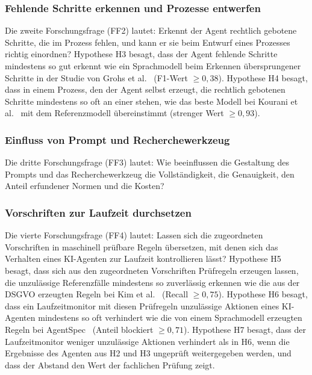 \subsubsection{Fehlende Schritte erkennen und Prozesse entwerfen}\label{sec:ff2}
Die zweite Forschungsfrage (FF2) lautet: Erkennt der Agent rechtlich gebotene Schritte, die im Prozess fehlen, und kann er sie beim Entwurf eines Prozesses richtig einordnen?
Hypothese H3 besagt, dass der Agent fehlende Schritte mindestens so gut erkennt wie ein Sprachmodell beim Erkennen übersprungener Schritte in der Studie von Grohs et al.~\cite{grohs2025} (F1-Wert $\geq 0{,}38$).
Hypothese H4 besagt, dass in einem Prozess, den der Agent selbst erzeugt, die rechtlich gebotenen Schritte mindestens so oft an einer  stehen, wie das beste Modell bei Kourani et al.~\cite{kourani2024} mit dem Referenzmodell übereinstimmt (strenger Wert $\geq 0{,}93$).

\subsubsection{Einfluss von Prompt und Recherchewerkzeug}\label{sec:ff3}
Die dritte Forschungsfrage (FF3) lautet: Wie beeinflussen die Gestaltung des Prompts und das Recherchewerkzeug die Vollständigkeit, die Genauigkeit, den Anteil erfundener Normen und die Kosten?

\subsubsection{Vorschriften zur Laufzeit durchsetzen}\label{sec:ff4}
Die vierte Forschungsfrage (FF4) lautet: Lassen sich die zugeordneten Vorschriften in maschinell prüfbare Regeln übersetzen, mit denen sich das Verhalten eines KI-Agenten zur Laufzeit kontrollieren lässt?
Hypothese H5 besagt, dass sich aus den zugeordneten Vorschriften Prüfregeln erzeugen lassen, die unzulässige Referenzfälle mindestens so zuverlässig erkennen wie die aus der DSGVO erzeugten Regeln bei Kim et al.~\cite{kim2026} (Recall $\geq 0{,}75$).
Hypothese H6 besagt, dass ein Laufzeitmonitor mit diesen Prüfregeln unzulässige Aktionen eines KI-Agenten mindestens so oft verhindert wie die von einem Sprachmodell erzeugten Regeln bei AgentSpec~\cite{wang2026agentspec} (Anteil blockiert $\geq 0{,}71$).
Hypothese H7 besagt, dass der Laufzeitmonitor weniger unzulässige Aktionen verhindert als in H6, wenn die Ergebnisse des Agenten aus H2 und H3 ungeprüft weitergegeben werden, und dass der Abstand den Wert der fachlichen Prüfung zeigt.

